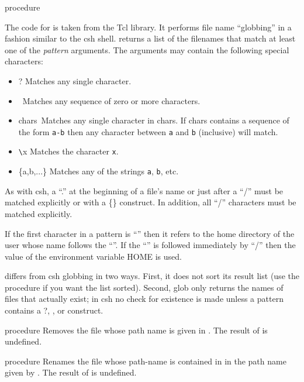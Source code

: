 \begin{entry}{%
 {procedure}}
\saut

The code for  is taken from the Tcl library. It performs
file name ``globbing'' in a fashion similar to the csh shell.
 returns a list of the filenames that match at least one of
the {\em pattern} arguments.  The  arguments may contain
the following special characters:

\begin{itemize}
\item ? Matches any single character.
\item \etoile~Matches any sequence of zero or more characters.
\item {\leftbracket}chars\rightbracket~Matches any single character in chars. 
      If chars contains a sequence of the form {\tt a-b} then any character between
       {\tt a} and {\tt b} (inclusive) will match.
\item  \verb+\+x  Matches the character {\tt x}.
\item \{a,b,...\} Matches any of the strings {\tt a}, {\tt b}, etc.
\end{itemize}

As with csh, a ``.'' at the beginning of a file's name or just after a ``/''
must be matched explicitly or with a \{\} construct.  In addition, all ``/''
characters must be matched explicitly.

If the first character in a pattern is ``{\tilda}'' then it refers to
the home directory of the user whose name follows the ``{\tilda}''.
If the ``{\tilda}'' is followed immediately by ``/'' then the value of
the environment variable HOME is used.

 differs from csh globbing in two ways.  First, it does not
sort its result list (use the  procedure if you want the list sorted).
Second, glob only returns the names of files that actually exist; in csh no
check for existence is made unless a pattern contains a ?, \etoile, or  
\leftbracket\rightbracket
construct.
\end{entry}

\begin{entry}{%
 {procedure}}
\saut
Removes the file whose path name is given in .
The result of  is undefined.
\end{entry}

\begin{entry}{%
 {procedure}}
\saut
Renames the file whose path-name is contained in  in the path 
name given by . The result of  is undefined.
\end{entry}

